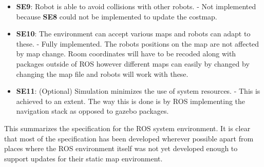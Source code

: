 \begin{itemize}
        \item \textbf{SE9}: Robot is able to avoid collisions with other robots. - Not implemented because \textbf{SE8} could not be implemented to update the costmap.

        \item \textbf{SE10}: The environment can accept various maps and robots can adapt to these. - Fully implemented. The robots positions on the map are not affected by map change. Room coordinates will have to be recoded along with packages outside of ROS however different maps can easily by changed by changing the map file and robots will work with these.

        \item \textbf{SE11}:  (Optional) Simulation minimizes the use of system resources. - This is achieved to an extent. The way this is done is by ROS implementing the navigation stack as opposed to gazebo packages.
      \end{itemize}

      This summarizes the specification for the ROS system environment. It is clear that most of the specification has been developed wherever possible apart from places where the ROS environment itself was not yet developed enough to support updates for their static map environment.


